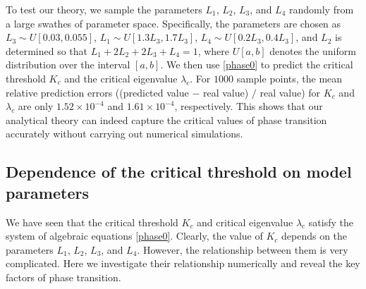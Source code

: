 \documentclass[a4paper,11pt]{article}
\begin{document}
To test our theory, we sample the parameters $L_1$, $L_2$, $L_3$, and $L_4$ randomly from a large swathes of parameter space. Specifically, the parameters are chosen as $L_3 \sim U[0.03, 0.055]$, $L_1 \sim U[1.3 L_3, 1.7 L_3]$, $L_4 \sim U[0.2 L_3, 0.4 L_3]$, and $L_2$ is determined so that $L_1 + 2 L_2 + 2 L_3 + L_4 = 1$, where $U[a,b]$ denotes the uniform distribution over the interval $[a,b]$. We then use \eqref{phase0} to predict the critical threshold $K_c$ and the critical eigenvalue $\lambda_c$. For $1000$ sample points, the mean relative prediction errors ((predicted value $-$ real value) $/$ real value) for $K_c$ and $\lambda_c$ are only $1.52 \times 10^{-4}$ and $1.61 \times 10^{-4}$, respectively. This shows that our analytical theory can indeed capture the critical values of phase transition accurately without carrying out numerical simulations.

\subsection{Dependence of the critical threshold on model parameters}
We have seen that the critical threshold $K_c$ and critical eigenvalue $\lambda_c$ satisfy the system of algebraic equations \eqref{phase0}. Clearly, the value of $K_c$ depends on the parameters $L_1$, $L_2$, $L_3$, and $L_4$. However, the relationship between them is very complicated. Here we investigate their relationship numerically and reveal the key factors of phase transition.
\end{document}
